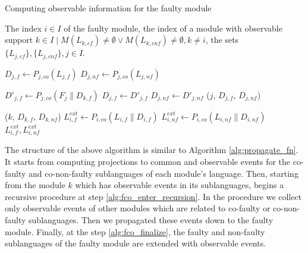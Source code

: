 \documentclass[a4paper, 10pt, conference]{ieeeconf}
\begin{document}
\begin{algorithm} 
\caption{Computing observable information for the faulty module} 
\begin{algorithmic}[1]
	\Require The index  $i \in I$ of the faulty module, the index of a module with
	observable support $k \in I \mid M(L_{k,cf}) \neq \emptyset \lor M(L_{k,cnf})
	\neq \emptyset, k \neq i$, the sets $\{L_{j,cf}\}, \{L_{j,cnf}\}, j \in I$.

	\label{alg:fco_init}
		\State $D_{j,f} \leftarrow P_{j,co}(L_{j,f})$
		\State $D_{j,nf} \leftarrow P_{j,co}(L_{j,nf})$
	\EndFor
	
			\State $D'_{j,f} \leftarrow 
			P_{j,co}(F_j \parallel D_{k,f})$
				\State $D_{j,f}\leftarrow D'_{j,f}$
				\State $D_{j,nf}\leftarrow D'_{j,nf}$
				\State {}($j$, $D_{j,f}$, $D_{j,nf}$)
			\EndIf
		\EndFor 
	\EndProcedure
	
	\State {}($k$, $D_{k,f}$, $D_{k,nf}$)
	\label{alg:fco_enter_recursion}
	\State $L_{i,f}^{ext} \leftarrow P_{i,co}(L_{i,f} \parallel D_{i,f})$
	\label{alg:fco_finalize}
	\State $L_{i,nf}^{ext} \leftarrow P_{i,co}(L_{i,nf} \parallel D_{i,nf})$
	\\
	\Return $L_{i,f}^{ext}, L_{i,nf}^{ext}$
\end{algorithmic}
\label{alg:propagate-d}
\end{algorithm}

The structure of the above algorithm is similar to Algorithm
\ref{alg:propagate_fn}. It starts from computing projections to common and
observable events for the co-faulty and co-non-faulty sublanguages of each
module's language. Then, starting from the module $k$ which has observable
events in its sublanguages, begins a recursive procedure at step
\ref{alg:fco_enter_recursion}. In the procedure we collect only observable
events of other modules which are related to co-faulty or co-non-faulty
sublanguages. Then we propagated these events down to the faulty module.
Finally, at the step \ref{alg:fco_finalize}, the faulty and non-faulty
sublanguages of the faulty module are extended with observable events.
\end{document}

